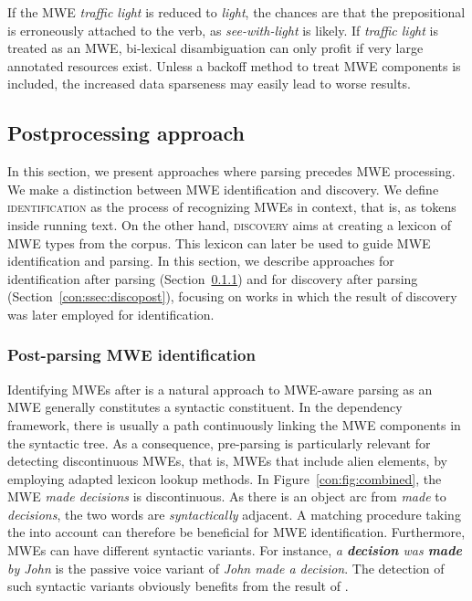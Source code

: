 \documentclass[output=paper]{langsci/langscibook}
\begin{document}
If the MWE \textit{traffic light} is reduced to \textit{light}, the chances are that the prepositional  is erroneously attached to the verb, as \textit{see-with-light} is likely. If \textit{traffic light} is treated as an MWE, bi-lexical disambiguation can only profit if very large annotated resources exist. Unless a backoff method to treat MWE components is included, the increased data sparseness may easily lead to worse results.



\subsection{Postprocessing approach}
\label{con:ssec:postproc}

In this section, we present approaches where parsing precedes MWE processing. We make a distinction between MWE identification and discovery. We define \textsc{identification} as the process of recognizing MWEs in context, that is, as tokens inside running text. On the other hand, \textsc{discovery} aims at creating a lexicon of MWE types from the corpus. This lexicon can later be used to guide MWE identification and parsing. In this section, we describe approaches for identification after parsing (Section~\ref{con:ssec:idpost}) and for discovery after parsing (Section~\ref{con:ssec:discopost}), focusing on works in which the result of discovery was later employed for identification.




\subsubsection{Post-parsing MWE identification}
\label{con:ssec:idpost}

Identifying MWEs after  is a natural approach to MWE-aware parsing as an MWE generally constitutes a syntactic constituent. In the dependency framework, there is usually a path continuously linking the MWE components in the syntactic tree. As a consequence, pre-parsing is particularly relevant for detecting discontinuous MWEs, that is, MWEs that include alien elements, by employing adapted lexicon lookup methods. In Figure~\ref{con:fig:combined}, the MWE \textit{made decisions} is discontinuous. As there is an object arc from \textit{made} to \textit{decisions}, the two words are \emph{syntactically} adjacent. A matching procedure taking the  into account can therefore be beneficial for MWE identification. 
Furthermore, MWEs can have different syntactic variants. For instance, \textit{a \textbf{decision} was \textbf{made} by John} is the passive voice variant of \textit{John made a decision}. The detection of such syntactic variants obviously benefits from the result of . 
\end{document}
